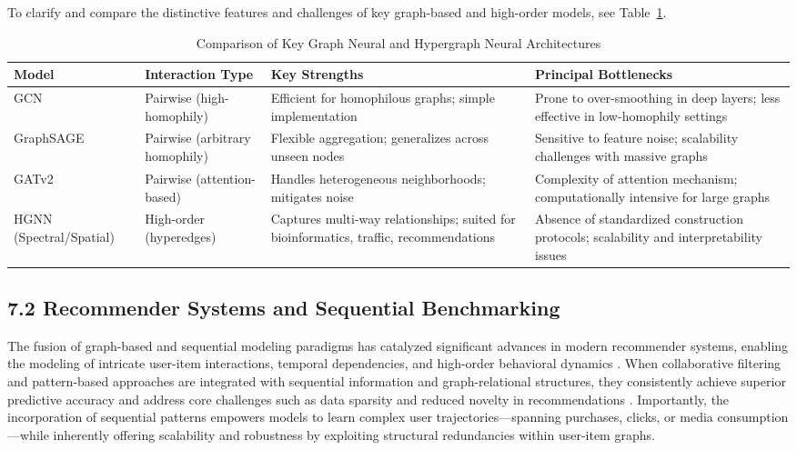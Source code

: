 \documentclass[11pt]{article}
\begin{document}
To clarify and compare the distinctive features and challenges of key graph-based and high-order models, see Table~\ref{tab:gnn_hgnn_comparison}.

\begin{table}[h]
\centering
\caption{Comparison of Key Graph Neural and Hypergraph Neural Architectures}
\label{tab:gnn_hgnn_comparison}
\begin{tabular}{|l|p{3.9cm}|p{4.3cm}|p{3.6cm}|}
\hline
\textbf{Model} & \textbf{Interaction Type} & \textbf{Key Strengths} & \textbf{Principal Bottlenecks} \\
\hline
GCN & Pairwise (high-homophily) & Efficient for homophilous graphs; simple implementation & Prone to over-smoothing in deep layers; less effective in low-homophily settings \\
\hline
GraphSAGE & Pairwise (arbitrary homophily) & Flexible aggregation; generalizes across unseen nodes & Sensitive to feature noise; scalability challenges with massive graphs \\
\hline
GATv2 & Pairwise (attention-based) & Handles heterogeneous neighborhoods; mitigates noise & Complexity of attention mechanism; computationally intensive for large graphs \\
\hline
HGNN (Spectral/Spatial) & High-order (hyperedges) & Captures multi-way relationships; suited for bioinformatics, traffic, recommendations & Absence of standardized construction protocols; scalability and interpretability issues \\
\hline
\end{tabular}
\end{table}

\subsection{7.2 Recommender Systems and Sequential Benchmarking}

The fusion of graph-based and sequential modeling paradigms has catalyzed significant advances in modern recommender systems, enabling the modeling of intricate user-item interactions, temporal dependencies, and high-order behavioral dynamics \cite{ref84}. When collaborative filtering and pattern-based approaches are integrated with sequential information and graph-relational structures, they consistently achieve superior predictive accuracy and address core challenges such as data sparsity and reduced novelty in recommendations \cite{ref84}. Importantly, the incorporation of sequential patterns empowers models to learn complex user trajectories—spanning purchases, clicks, or media consumption—while inherently offering scalability and robustness by exploiting structural redundancies within user-item graphs.
\end{document}
